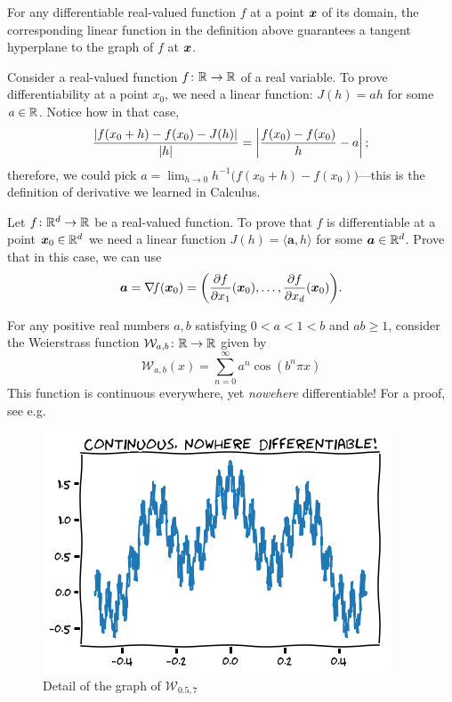 For any differentiable real-valued function $f$ at a point $\boldsymbol{x}$ of its domain, the corresponding linear function in the definition above guarantees a tangent hyperplane to the graph of $f$ at $\boldsymbol{x}$.  
 
\begin{example}\label{example:derivatives}
Consider a real-valued function $f\colon \mathbb{R} \to \mathbb{R}$ of a real variable. To prove differentiability at a point $x_0$, we need a linear function: $J(h)=ah$ for some $a\in \mathbb{R}$. Notice how in that case, 
\begin{equation*}
\frac{\lvert f(x_0+h)-f(x_0)-J(h) \rvert}{\lvert h \rvert} = \left\lvert \frac{f(x_0)-f(x_0)}{h} - a \right\lvert;
\end{equation*}
therefore, we could pick $a = \lim_{h\to 0} h^{-1}\big( f(x_0+h) - f(x_0) \big)$---this is the definition of derivative we learned in Calculus.
\end{example}

\begin{problem}\label{problem:gradient}
Let $f\colon \mathbb{R}^d \to \mathbb{R}$ be a real-valued function.  To prove that $f$ is differentiable at a point $\boldsymbol{x}_0 \in \mathbb{R}^d$ we need a linear function $J(h) = \langle \boldsymbol{a}, h \rangle$ for some $\boldsymbol{a} \in \mathbb{R}^d$.  Prove that in this case, we can use
\begin{equation*}
\boldsymbol{a} = \mathop{\nabla\! {f}}(\boldsymbol{x}_0)= \bigg( \frac{\partial f}{\partial x_1}(\boldsymbol{x}_0), \dotsc, \frac{\partial f}{\partial x_d}(\boldsymbol{x}_0) \bigg).
\end{equation*}
\end{problem}

\begin{example}\label{example:WeierstrassFunction}
For any positive real numbers $a, b$ satisfying $0<a<1<b$ and $ab \geq 1$, consider the Weierstrass function $\mathcal{W}_{a,b} \colon \mathbb{R} \to \mathbb{R}$ given by 
\begin{equation*}
\mathcal{W}_{a,b}(x) = \sum_{n=0}^\infty a^n \cos(b^n \pi x)
\end{equation*}
This function is continuous everywhere, yet \emph{nowehere} differentiable!  For a proof, see e.g.~\cite{hardy1916weierstrass}
\begin{figure}[ht!]
\includegraphics[width=0.6\linewidth]{weierstrass.png}
\caption{Detail of the graph of $\mathcal{W}_{0.5, 7}$}
\label{figure:WeierstrassFunction}
\end{figure}
\end{example}

